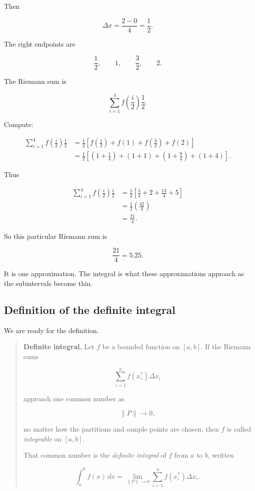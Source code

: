 Then

\[
\Delta x=\frac{2-0}{4}=\frac12.
\]

The right endpoints are

\[
\frac12,\qquad 1,\qquad \frac32,\qquad 2.
\]

The Riemann sum is

\[
\sum_{i=1}^{4} f\left(\frac{i}{2}\right)\frac12.
\]

Compute:

\[
\begin{aligned}
\sum_{i=1}^{4} f\left(\frac{i}{2}\right)\frac12
&=
\frac12\left[
f\left(\frac12\right)+f(1)+f\left(\frac32\right)+f(2)
\right] \\[4pt]
&=
\frac12\left[
\left(1+\frac14\right)+(1+1)+\left(1+\frac94\right)+(1+4)
\right].
\end{aligned}
\]

Thus

\[
\begin{aligned}
\sum_{i=1}^{4} f\left(\frac{i}{2}\right)\frac12
&=
\frac12\left[
\frac54+2+\frac{13}{4}+5
\right] \\[4pt]
&=
\frac12\left(\frac{42}{4}\right) \\[4pt]
&=
\frac{21}{4}.
\end{aligned}
\]

So this particular Riemann sum is

\[
\boxed{\frac{21}{4}=5.25.}
\]

It is one approximation.  The integral is what these approximations approach as the
subintervals become thin.

\subsection{Definition of the definite integral}
\label{subsec:definite-integral-definition}

We are ready for the definition.

\begin{quote}
\textbf{Definite integral.}
Let \(f\) be a bounded function on \([a,b]\).  If the Riemann sums

\[
\sum_{i=1}^{n} f(x_i^*)\Delta x_i
\]

approach one common number as

\[
\lVert P\rVert\to0,
\]

no matter how the partitions and sample points are chosen, then \(f\) is called
\emph{integrable} on \([a,b]\).

That common number is the \emph{definite integral} of \(f\) from \(a\) to \(b\), written

\[
\boxed{
\int_a^b f(x)\,dx
=
\lim_{\lVert P\rVert\to0}
\sum_{i=1}^{n} f(x_i^*)\Delta x_i.
}
\]
\end{quote}

